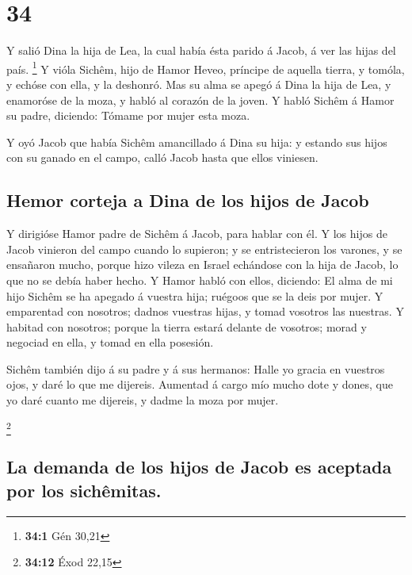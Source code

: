 \hypertarget{section-33}{%
\section{34}\label{section-33}}

 Y salió Dina la hija de Lea, la cual había ésta parido á
Jacob, á ver las hijas del país. \footnote{\textbf{34:1} Gén 30,21}
 Y vióla Sichêm, hijo de Hamor Heveo, príncipe de aquella
tierra, y tomóla, y echóse con ella, y la deshonró.  Mas su
alma se apegó á Dina la hija de Lea, y enamoróse de la moza, y habló al
corazón de la joven.  Y habló Sichêm á Hamor su padre,
diciendo: Tómame por mujer esta moza.

 Y oyó Jacob que había Sichêm amancillado á Dina su hija: y
estando sus hijos con su ganado en el campo, calló Jacob hasta que ellos
viniesen.

\hypertarget{hemor-corteja-a-dina-de-los-hijos-de-jacob}{%
\subsection{Hemor corteja a Dina de los hijos de
Jacob}\label{hemor-corteja-a-dina-de-los-hijos-de-jacob}}

 Y dirigióse Hamor padre de Sichêm á Jacob, para hablar con
él.  Y los hijos de Jacob vinieron del campo cuando lo
supieron; y se entristecieron los varones, y se ensañaron mucho, porque
hizo vileza en Israel echándose con la hija de Jacob, lo que no se debía
haber hecho.  Y Hamor habló con ellos, diciendo: El alma de
mi hijo Sichêm se ha apegado á vuestra hija; ruégoos que se la deis por
mujer.  Y emparentad con nosotros; dadnos vuestras hijas, y
tomad vosotros las nuestras.  Y habitad con nosotros;
porque la tierra estará delante de vosotros; morad y negociad en ella, y
tomad en ella posesión.

 Sichêm también dijo á su padre y á sus hermanos: Halle yo
gracia en vuestros ojos, y daré lo que me dijereis. 
Aumentad á cargo mío mucho dote y dones, que yo daré cuanto me dijereis,
y dadme la moza por mujer.

\footnote{\textbf{34:12} Éxod 22,15}

\hypertarget{la-demanda-de-los-hijos-de-jacob-es-aceptada-por-los-sichuxeamitas.}{%
\subsection{La demanda de los hijos de Jacob es aceptada por los
sichêmitas.}\label{la-demanda-de-los-hijos-de-jacob-es-aceptada-por-los-sichuxeamitas.}}

